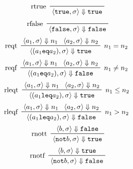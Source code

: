				\begin{multicols}{2}
					\begin{equation*}
						\prftree[l]
						{ rtrue }
						{ \langle \texttt{true}, \sigma \rangle \Downarrow \texttt{true} }
					\end{equation*}
					\begin{equation*}
						\prftree[l]
						{ rfalse }
						{ \langle \texttt{false}, \sigma \rangle \Downarrow \texttt{false} }
					\end{equation*}
					\begin{equation*}
						\prftree[l, r]
						{ $ n _ 1 = n _ 2 $ }
						{ reqt }
						{ \langle a _ 1, \sigma \rangle \Downarrow n _ 1 }
						{ \langle a _ 2, \sigma \rangle \Downarrow n _ 2 }
						{ \langle (a _ 1 \texttt{eq} a _ 2), \sigma \rangle \Downarrow \texttt{true} }
					\end{equation*}
					\begin{equation*}
						\prftree[l, r]
						{ $ n _ 1 \neq n _ 2 $ }
						{ reqf }
						{ \langle a _ 1, \sigma \rangle \Downarrow n _ 1 }
						{ \langle a _ 2, \sigma \rangle \Downarrow n _ 2 }
						{ \langle (a _ 1 \texttt{eq} a _ 2), \sigma \rangle \Downarrow \texttt{false} }
					\end{equation*}
					\begin{equation*}
						\prftree[l, r]
						{ $ n _ 1 \leq n _ 2 $ }
						{ rleqt }
						{ \langle a _ 1, \sigma \rangle \Downarrow n _ 1 }
						{ \langle a _ 2, \sigma \rangle \Downarrow n _ 2 }
						{ \langle (a _ 1 \texttt{leq} a _ 2), \sigma \rangle \Downarrow \texttt{true} }
					\end{equation*}
					\begin{equation*}
						\prftree[l, r]
						{ $ n _ 1 > n _ 2 $ }
						{ rleqf }
						{ \langle a _ 1, \sigma \rangle \Downarrow n _ 1 }
						{ \langle a _ 2, \sigma \rangle \Downarrow n _ 2 }
						{ \langle (a _ 1 \texttt{leq} a _ 2), \sigma \rangle \Downarrow \texttt{false} }
					\end{equation*}
					\begin{equation*}
						\prftree[l]
						{ rnott }
						{ \langle b, \sigma \rangle \Downarrow \texttt{false} }
						{ \langle \texttt{not} b, \sigma \rangle \Downarrow \texttt{true} }
					\end{equation*}
					\begin{equation*}
						\prftree[l]
						{ rnotf }
						{ \langle b, \sigma \rangle \Downarrow \texttt{true} }
						{ \langle \texttt{not} b, \sigma \rangle \Downarrow \texttt{false} }

\end{equation*}
\end{multicols}
